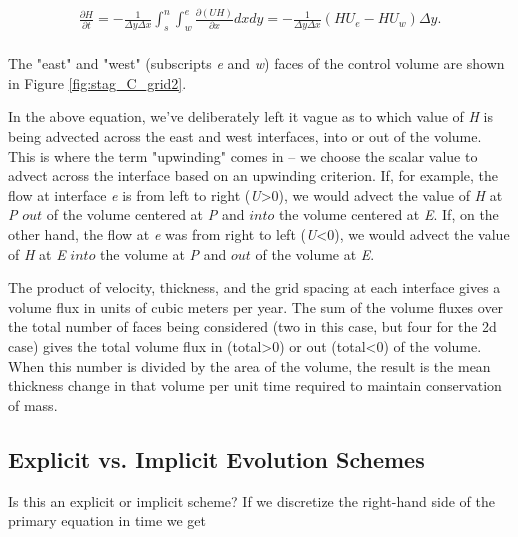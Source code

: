 \begin{align*}
\frac{\partial H}{\partial t}=-\frac{1}{\Delta y\Delta x}\int_{s}^{n}{\int_{w}^{e}{\frac{\partial \left( UH \right)}{\partial x}}}dxdy=-\frac{1}{\Delta y\Delta x}\left( HU_{e}-HU_{w} \right)\Delta y. \\
\end{align*}

The "east" and "west" (subscripts \textit{e} and \textit{w}) faces of the control volume are shown in Figure \ref{fig:stag_C_grid2}.


In the above equation, we've deliberately left it vague as to which value of \textit{H} is being advected across the east and west interfaces, into or out of the volume. This is where the term "upwinding" comes in -- we choose the scalar value to advect across the interface based on an upwinding criterion. If, for example, the flow at interface \textit{e} is from left to right (\textit{U}>0), we would advect the value of \textit{H} at \textit{P} $out$ of the volume centered at \textit{P} and $into$ the volume centered at \textit{E}. If, on the other hand, the flow at \textit{e} was from right to left (\textit{U}<0), we would advect the value of \textit{H} at \textit{E} $into$ the volume at \textit{P} and $out$ of the volume at \textit{E}. 

The product of velocity, thickness, and the grid spacing at each interface gives a volume flux in units of cubic meters per year. The sum of the volume fluxes over the total number of faces being considered (two in this case, but four for the 2d case) gives the total volume flux in (total>0) or out (total<0) of the volume. When this number is divided by the area of the volume, the result is the mean thickness change in that volume per unit time required to maintain conservation of mass.

\subsection{Explicit vs. Implicit Evolution Schemes}
Is this an explicit or implicit scheme? If we discretize the right-hand side of the primary equation in time we get

